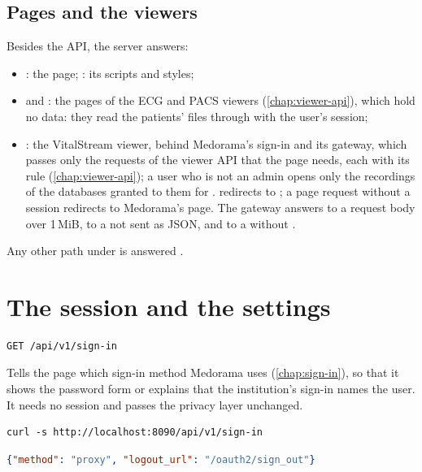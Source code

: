 \subsection{Pages and the viewers}
\label{sec:http-api-pages}

Besides the API, the server answers:
\begin{itemize}
\item {}: the page; : its scripts and styles;
\item {} and : the pages of the ECG and
  PACS viewers (\cref{chap:viewer-api}), which hold no data: they read the patients' files
  through  with the user's session;
\item {}: the VitalStream viewer, behind Medorama's sign-in and its gateway,
  which passes only the requests of the viewer API that the page needs, each with its rule
  (\cref{chap:viewer-api}); a user who is not an admin opens only the recordings of the databases
  granted to them for .  redirects to ; a page request
  without a session redirects to Medorama's page. The gateway answers  to a request body
  over 1\,MiB,  to a  not sent as JSON, and  to a 
  without .
\end{itemize}
Any other path under  is answered .

\section{The session and the settings}
\label{sec:http-api-session}

\begin{lstlisting}[style=signature]
GET /api/v1/sign-in
\end{lstlisting}
Tells the page which sign-in method Medorama uses (\cref{chap:sign-in}), so that it shows the
password form or explains that the institution's sign-in names the user. It needs no session and
passes the privacy layer unchanged.
\begin{lstlisting}[style=shell]
curl -s http://localhost:8090/api/v1/sign-in
\end{lstlisting}
\begin{lstlisting}[language=JSON]
{"method": "proxy", "logout_url": "/oauth2/sign_out"}
\end{lstlisting}

